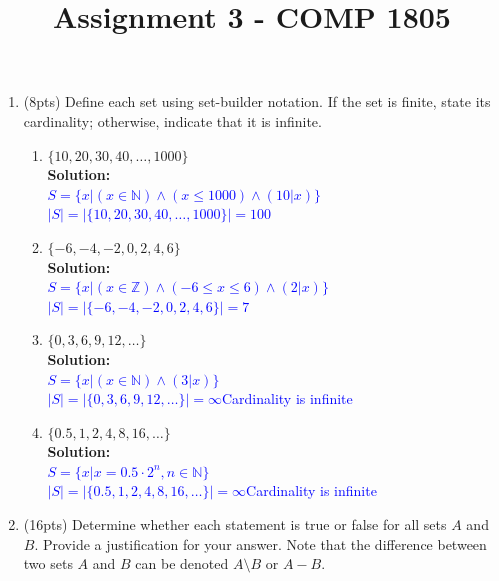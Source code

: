 \documentclass{article}
\newcommand{\sol}[1]{\textbf{Solution:\,}\textcolor{blue}{#1}}
\begin{document}

\title{Assignment 3 - COMP 1805}
\date{} %
\maketitle
\thispagestyle{fancy}



\medskip
\begin{enumerate}



\item(8pts) Define each set using set-builder notation. If the set is finite, state its cardinality; otherwise, indicate that it is infinite.

\begin{enumerate}
\item $\{ 10, 20, 30, 40,  \ldots, 1000 \}$
\\\sol{
\\$S=\{x|(x\in\mathbb{N})\land(x\leq 1000)\land (10|x)\}$
\\$|S|=|\{ 10, 20, 30, 40,  \ldots, 1000 \}|=100$
}
\item $\{ -6, -4, -2, 0, 2, 4, 6 \}$
\\\sol{
\\$S=\{x|(x\in\mathbb{Z})\land(-6\leq x\leq 6)\land (2|x)\}$
\\$|S|=|\{ -6, -4, -2, 0, 2, 4, 6 \}|=7$
}
\item $\{ 0,3,6,9,12, \ldots \}$
\\\sol{
\\$S=\{x|(x\in\mathbb{N})\land(3|x)\}$
\\$|S|=|\{ 0,3,6,9,12, \ldots \}|=\infty$\quad Cardinality is infinite
}
\item $\{ 0.5, 1, 2, 4, 8, 16, \ldots \}$
\\\sol{
\\$S=\{x|x=0.5\cdot2^n,n\in\mathbb{N}\}$
\\$|S|=|\{ 0.5, 1, 2, 4, 8, 16, \ldots \}|=\infty$\quad Cardinality is infinite
}
\end{enumerate}

\newpage

\item(16pts) Determine whether each statement is true or false for all sets $A$ and $B$. Provide a justification for your answer. Note that the difference between two sets $A$ and $B$ can be denoted $A \setminus B$ or $A - B$. 


\end{enumerate}
\end{document}
